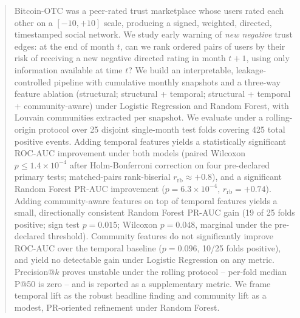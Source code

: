 %

\begin{abstract}
Bitcoin-OTC was a peer-rated trust marketplace whose users rated each
other on a $[-10, +10]$ scale, producing a signed, weighted, directed,
timestamped social network. We study early warning of \emph{new
negative} trust edges: at the end of month $t$, can we rank ordered
pairs of users by their risk of receiving a new negative directed
rating in month $t{+}1$, using only information available at time $t$?
We build an interpretable, leakage-controlled pipeline with cumulative
monthly snapshots and a three-way feature ablation
(structural; structural + temporal; structural + temporal + community-aware)
under Logistic Regression and Random Forest, with Louvain communities
extracted per snapshot. We evaluate under a rolling-origin protocol
over 25 disjoint single-month test folds covering 425 total positive
events. Adding temporal features yields a statistically significant
ROC-AUC improvement under both models (paired Wilcoxon
$p \leq 1.4\!\times\!10^{-4}$ after Holm-Bonferroni correction on
four pre-declared primary tests; matched-pairs rank-biserial
$r_{\mathrm{rb}} \approx +0.8$), and a significant Random Forest PR-AUC
improvement ($p = 6.3\!\times\!10^{-4}$, $r_{\mathrm{rb}} = +0.74$).
Adding community-aware features on top of temporal features yields a
small, directionally consistent Random Forest PR-AUC gain (19 of 25
folds positive; sign test $p = 0.015$; Wilcoxon $p = 0.048$, marginal
under the pre-declared threshold). Community features do not
significantly improve ROC-AUC over the temporal baseline ($p = 0.096$,
10/25 folds positive), and yield no detectable gain under Logistic
Regression on any metric. Precision@$k$ proves unstable under the
rolling protocol -- per-fold median P@50 is zero -- and is reported
as a supplementary metric. We frame temporal lift as the robust
headline finding and community lift as a modest, PR-oriented
refinement under Random Forest.
\end{abstract}

